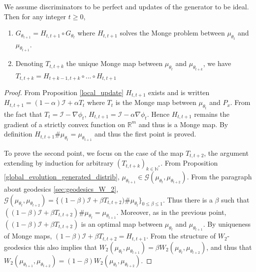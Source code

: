 \documentclass[runningheads]{llncs}
\newcommand{\id}{\mathcal{I}}
\begin{document}
\begin{lemma}
\normalfont
\label{composition_monge_ismonge}
We assume discriminators to be perfect and updates of the generator to be ideal. Then for any integer $t\geqslant 0$,
\begin{enumerate}
\item $G_{\theta_{t+1}}=H_{t,t+1}\circ G_{\theta_{t}}$ where $H_{t,t+1}$ solves the Monge problem between ${\mu_{\theta_t}}$ and $\mu_{\theta_{t+1}}$.
\item Denoting $T_{t,t+k}$ the unique Monge map between $\mu_{\theta_t}$ and $\mu_{\theta_{t+k}}$, we have $T_{t,t+k}=H_{t+k-1,t+k}\circ ... \circ H_{t,t+1}$
\end{enumerate}
\end{lemma}
\begin{proof}
From Proposition \ref{local_update} $H_{t,t+1}$ exists and is written $H_{t,t+1}=(1-\alpha)\id + \alpha T_t$ where $T_t$ is the Monge map between $\mu_{\theta_t}$ and $P_x$. From the fact that $T_t=\id- \nabla \phi_t$, $H_{t,t+1}=\id -\alpha \nabla \phi_t$. Hence $H_{t,t+1}$ remains the gradient of a strictly convex function on $\mathds{R}^m$ and thus is a Monge map. By definition $H_{t,t+1}\#\mu_{\theta_t}=\mu_{\theta_{t+1}}$ and thus the first point is proved. 

To prove the second point, we focus on the case of the map $T_{t,t+2}$, the argument extending by induction for arbitrary $(T_{t,t+k})_{k\in \mathds{N}^*}$. From Proposition \ref{global_evolution_generated_distrib}, $\mu_{\theta_{t+1}}\in \mathcal{G}(\mu_{\theta_{t}},\mu_{\theta_{t+2}})$. From the paragraph about geodesics \ref{sec:geodesics_W_2}, $\mathcal{G}(\mu_{\theta_{t}},\mu_{\theta_{t+2}})=\{(1-\beta)\id+\beta T_{t,t+2})\#\mu_{\theta_{t}}\}_{0\leqslant \beta \leqslant 1}$. Thus there is a $\beta$ such that $((1-\beta)\id+\beta T_{t,t+2})\#\mu_{\theta_{t}}=\mu_{\theta_{t+1}}$. Moreover, as in the previous point, $((1-\beta)\id+\beta T_{t,t+2})$ is an optimal map between $\mu_{\theta_{t}}$ and $\mu_{\theta_{t+1}}$. By uniqueness of Monge maps, $(1-\beta)\id+\beta T_{t,t+2}=H_{t,t+1}$. From the structure of $W_2$-geodesics this also implies that $W_2(\mu_{\theta_t},\mu_{\theta_{t+1}})=\beta W_2(\mu_{\theta_{t}},\mu_{\theta_{t+2}})$, and thus that $W_2(\mu_{\theta_{t+1}},\mu_{\theta_{t+2}})=(1-\beta) W_2(\mu_{\theta_{t}},\mu_{\theta_{t+2}})$.


\end{proof}
\end{document}
